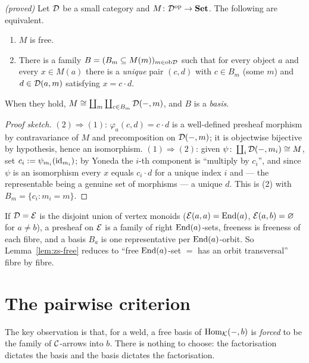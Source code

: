 \begin{lemma}[Free $=$ unique factorisation]\label{lem:zs-free}
\emph{(proved)}\;
Let $\mathcal{D}$ be a small category and $M\colon\mathcal{D}^{\mathrm{op}}\to\mathbf{Set}$. The following are
equivalent.
\begin{enumerate}
\item $M$ is free.
\item There is a family $B=(B_m\subseteq M(m))_{m\in\mathrm{ob}\mathcal{D}}$ such that for every
object $a$ and every $x\in M(a)$ there is a \emph{unique} pair $(c,d)$ with $c\in
B_m$ (some $m$) and $d\in\mathcal{D}(a,m)$ satisfying $x=c\cdot d$.
\end{enumerate}
When they hold, $M\cong\coprod_{m}\coprod_{c\in B_m}\mathcal{D}(-,m)$, and $B$ is a
\emph{basis}.
\end{lemma}

\begin{proof}[Proof sketch]
$(2)\Rightarrow(1)$: $\varphi_a(c,d)=c\cdot d$ is a well-defined presheaf morphism
by contravariance of $M$ and precomposition on $\mathcal{D}(-,m)$; it is objectwise
bijective by hypothesis, hence an isomorphism. $(1)\Rightarrow(2)$: given
$\psi\colon\coprod_i\mathcal{D}(-,m_i)\cong M$, set $c_i:=\psi_{m_i}(\mathrm{id}_{m_i})$; by Yoneda
the $i$-th component is ``multiply by $c_i$'', and since $\psi$ is an isomorphism
every $x$ equals $c_i\cdot d$ for a unique index $i$ and --- the representable being
a genuine set of morphisms --- a unique $d$. This is (2) with $B_m=\{c_i:m_i=m\}$.
\end{proof}

\begin{remark}\label{rem:zs-monoids}
If $\mathcal{D}=\mathcal{E}$ is the disjoint union of vertex monoids ($\mathcal{E}(a,a)=\mathrm{End}(a)$,
$\mathcal{E}(a,b)=\varnothing$ for $a\neq b$), a presheaf on $\mathcal{E}$ is a family of right
$\mathrm{End}(a)$-sets, freeness is freeness of each fibre, and a basis $B_a$ is one
representative per $\mathrm{End}(a)$-orbit. So Lemma~\ref{lem:zs-free} reduces to
``free $\mathrm{End}(a)$-set $=$ has an orbit transversal'' fibre by fibre.
\end{remark}

\section{The pairwise criterion}\label{sec:zs-criterion}

The key observation is that, for a weld, a free basis of $\mathrm{Hom}_{\mathcal{K}}(-,b)$ is
\emph{forced} to be the family of $\mathcal{C}$-arrows into $b$. There is nothing to choose:
the factorisation dictates the basis and the basis dictates the factorisation.


